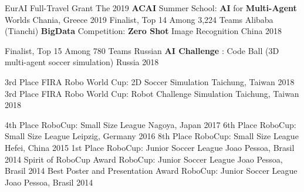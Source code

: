 



\begin{cvhonors}

  \cvhonor
    {EurAI Full-Travel Grant} %
    {The 2019 \textbf{ACAI} Summer School: \textbf{AI} for \textbf{Multi-Agent} Worlds} %
    {Chania, Greece} %
    {2019} %
  \cvhonor
    {Finalist, Top 14 Among 3,224 Teams} %
    {Alibaba (Tianchi) \textbf{BigData} Competition: \textbf{Zero Shot} Image Recognition} %
    {China} %
    {2018} %

  \cvhonor
    {Finalist, Top 15 Among 780 Teams} %
    {Russian \textbf{AI Challenge} : Code Ball (3D multi-agent soccer simulation)} %
    {Russia} %
    {2018} %

  \cvhonor
    {3rd Place} %
    {FIRA Robo World Cup: 2D Soccer Simulation} %
    {Taichung, Taiwan} %
    {2018} %
  \cvhonor
    {3rd Place} %
    {FIRA Robo World Cup: Robot Challenge Simulation} %
    {Taichung, Taiwan} %
    {2018} %
    
  \cvhonor
    {4th Place} %
    {RoboCup: Small Size League} %
    {Nagoya, Japan} %
    {2017} %
  \cvhonor
    {6th Place} %
    {RoboCup: Small Size League} %
    {Leipzig, Germany} %
    {2016} %
  \cvhonor
    {8th Place} %
    {RoboCup: Small Size League} %
    {Hefei, China} %
    {2015} %
  \cvhonor
    {1st Place} %
    {RoboCup: Junior Soccer League} %
    {Joao Pessoa, Brasil} %
    {2014} %
  \cvhonor
    {Spirit of RoboCup Award} %
    {RoboCup: Junior Soccer League} %
    {Joao Pessoa, Brasil} %
    {2014} %
  \cvhonor
    {Best Poster and Presentation Award} %
    {RoboCup: Junior Soccer League} %
    {Joao Pessoa, Brasil} %
    {2014} %
\end{cvhonors}


